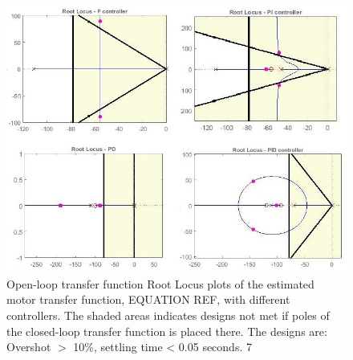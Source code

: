 \begin{figure}[h!]
\centering
\includegraphics[scale=0.7]{Billeder/RlocusControllers.jpg}
\caption{ Open-loop transfer function Root Locus plots of the estimated motor transfer function, EQUATION REF, with different controllers. The shaded areas indicates designs not met if poles of the closed-loop transfer function is placed there. 
The designs are: Overshot $>$ 10\%, settling time < 0.05 seconds. 7 }
\label{fig:RlocusControllers}
\end{figure}






























